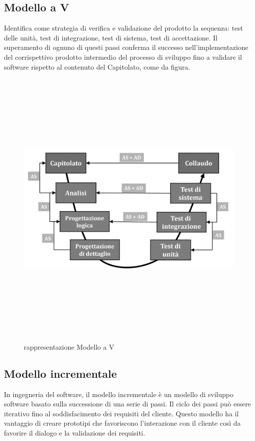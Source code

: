 	\subsection*{Modello a V}
		Identifica come strategia di verifica e validazione del prodotto la sequenza: test delle unità, test di integrazione, test di sistema, test di accettazione. Il superamento di ognuno di questi passi conferma il successo nell'implementazione del corrispettivo prodotto intermedio del processo di sviluppo fino a validare il software rispetto al contenuto del Capitolato, come da figura.
		\\
		\begin{figure}[H]
                \centering
                \includegraphics[width=14cm,height=14cm,keepaspectratio]{./images/modello_v.png}
                \caption{rappresentazione Modello a V}
        \end{figure}

    \subsection*{Modello incrementale}

        In ingegneria del software, il modello incrementale è un modello di sviluppo software basato sulla successione di
        una serie di passi. Il ciclo dei passi può essere iterativo fino al soddisfacimento dei requisiti del cliente.
        Questo modello ha il vantaggio di creare prototipi che favoriscono l'interazione con il cliente così da favorire
        il dialogo e la validazione dei requisiti.
